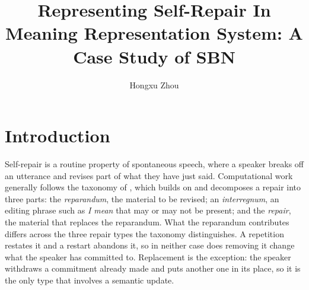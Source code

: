 \documentclass{article}
\title{Representing Self-Repair In Meaning Representation System: A Case Study of SBN}
\author{Hongxu Zhou}
\begin{document}
\pagestyle{empty}

\maketitle

\hypersetup{
    colorlinks=true,
    linkcolor=black,
    citecolor=black,
    urlcolor=blue
}


\newcommand{\sbnterm}[1]{\texttt{#1}}



\section{Introduction}

Self-repair is a routine property of spontaneous speech, where a speaker breaks off
an utterance and revises part of what they have just said. Computational work
generally follows the taxonomy of \citet{shribergPreliminaries1994}, which
builds on \citet{leveltMonitoringSelfrepair1983} and decomposes a repair into
three parts: the \emph{reparandum}, the material to
be revised; an \emph{interregnum}, an editing phrase such as \textit{I mean} that
may or may not be present; and the \emph{repair}, the material that replaces the reparandum.
What the reparandum contributes differs across the three repair types the
taxonomy distinguishes. A repetition restates it and a restart abandons it, so in
neither case does removing it change what the speaker has committed to.
Replacement is the exception: the speaker withdraws a commitment already made and
puts another one in its place, so it is the only type that involves a semantic
update.

\end{document}
